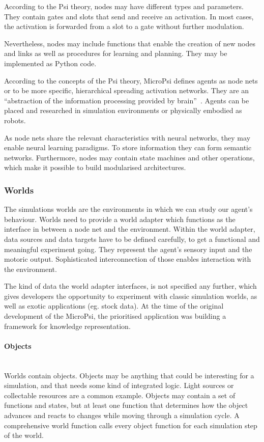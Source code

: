 According to the Psi theory, nodes may have different types and parameters. They contain gates and slots that send and receive an activation. In most cases, the activation is forwarded from a slot to a gate without further modulation.

Nevertheless, nodes may include functions that enable the creation of new nodes and links as well as procedures for learning and planning. They may be implemented as Python code.

According to the concepts of the Psi theory, MicroPsi defines agents as node nets or to be more specific, hierarchical spreading activation networks. They are an ``abstraction of the information processing provided by brain''~\cite{conf/agi/Bach12}. Agents can be placed and researched in simulation environments or physically embodied as robots.



As node nets share the relevant characteristics with neural networks, they may enable neural learning paradigms. To store information they can form semantic networks. Furthermore, nodes may contain state machines and other operations, which make it possible to build modularised architectures.

        \subsubsection{Worlds}
The simulations worlds are the environments in which we can study our agent's behaviour. Worlds need to provide a world adapter which functions as the interface in between a node net and the environment. Within the world adapter, data sources and data targets have to be defined carefully, to get a functional and meaningful experiment going. They represent the agent's sensory input and the motoric output. Sophisticated interconnection of those enables interaction with the environment.

The kind of data the world adapter interfaces, is not specified any further, which gives developers the opportunity to experiment with classic simulation worlds, as well as exotic applications (eg. stock data). At the time of the original development of the MicroPsi, the prioritised application was building a framework for knowledge representation.

            \paragraph{Objects}$\;$ \\
Worlds contain objects. Objects may be anything that could be interesting for a simulation, and that needs some kind of integrated logic. Light sources or collectable resources are a common example. Objects may contain a set of functions and states, but at least one function that determines how the object advances and reacts to changes while moving through a simulation cycle. A comprehensive world function calls every object function for each simulation step of the world.

